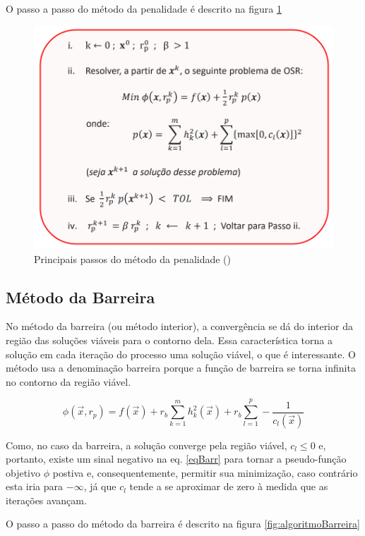 \documentclass[10pt, a4paper]{article}
\begin{document}
O passo a passo do m\'etodo da penalidade \'e descrito na figura \ref{fig:algoritmoPenalidade}

\begin{figure}[H]
      \centering
      \includegraphics[width=.6\textwidth]{algoritmoPenalidade.PNG}
      \caption{Principais passos do m\'etodo da penalidade (\cite{ppt})}
      \label{fig:algoritmoPenalidade}
\end{figure}

\subsection{M\'etodo da Barreira}

No m\'etodo da barreira (ou m\'etodo interior), a converg\^encia se d\'a do interior da regi\~ao das solu\c c\~oes vi\'aveis para o contorno dela. Essa caracter\'istica torna a solu\c c\~ao em cada itera\c c\~ao do processo uma solu\c c\~ao vi\'avel, o que \'e interessante. O m\'etodo usa a denomina\c c\~ao barreira porque a fun\c c\~ao de barreira se torna infinita no contorno da regi\~ao vi\'avel.

\begin{equation} \label{eqBarr}
      \phi (\vec{x}, r_p) = f(\vec{x}) + r_b \sum_{k=1}^{m} h_k^2(\vec{x}) + r_b \sum_{l=1}^{p} - \frac{1}{c_l(\vec{x})}
\end{equation}

Como, no caso da barreira, a solu\c c\~ao converge pela regi\~ao vi\'avel, $c_l \leq 0$ e, portanto, existe um sinal negativo na eq. \ref{eqBarr} para tornar a pseudo-fun\c c\~ao objetivo $\phi$ postiva e, consequentemente, permitir sua minimiza\c c\~ao, caso contr\'ario esta iria para $-\infty$, j\'a que $c_l$ tende a se aproximar de zero \`a medida que as itera\c c\~oes avan\c cam.

O passo a passo do m\'etodo da barreira \'e descrito na figura \ref{fig:algoritmoBarreira}
\end{document}
